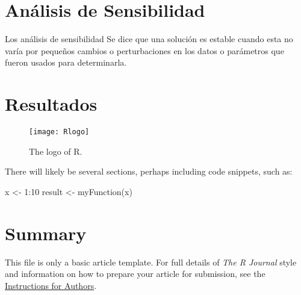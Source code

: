 \section{Análisis de Sensibilidad}

Los análisis de sensibilidad
Se dice que una solución es estable cuando esta no varía por pequeños cambios o perturbaciones en los datos o parámetros que fueron usados para determinarla\citep{2}.


\section{Resultados}


\begin{figure}[htbp]
  \centering
  \texttt{[image: Rlogo]}
  \caption{The logo of R.}
  \label{figure:rlogo}
\end{figure}

There will likely be several sections, perhaps including code snippets, such as:

\begin{example}
  x <- 1:10
  result <- myFunction(x)
\end{example}

\section{Summary}

This file is only a basic article template. For full details of \emph{The R Journal} style and information on how to prepare your article for submission, see the \href{http://journal.r-project.org/latex/RJauthorguide.pdf}{Instructions for Authors}.



\address{Author One\\
  Affiliation\\
  Address\\
  Country}

\address{Author Two\\
  Affiliation\\
  Address\\
  Country}

\address{Author Three\\
  Affiliation\\
  Address\\
  Country}

\address{Author Four\\
  Affiliation\\
  Address\\
  Country}

\address{Author Five\\
  Affiliation\\
  Address\\
  Country}

\address{Author Six\\
  Affiliation\\
  Address\\
  Country}
